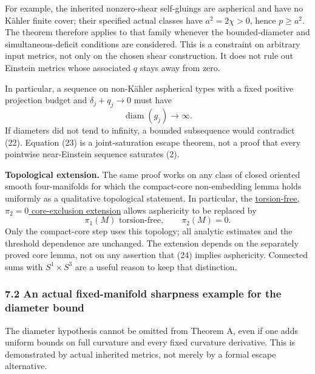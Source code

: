 \documentclass[
  11pt,
]{article}
\begin{document}
For example, the inherited nonzero-shear self-gluings are aspherical and
have no Kähler finite cover; their specified actual classes have
\(a^2=2\chi>0\), hence \(p\ge a^2\). The theorem therefore applies to
that family whenever the bounded-diameter and simultaneous-deficit
conditions are considered. This is a constraint on arbitrary input
metrics, not only on the chosen shear construction. It does not rule out
Einstein metrics whose associated \(q\) stays away from zero.

In particular, a sequence on non-Kähler aspherical types with a fixed
positive projection budget and \(\delta_j+q_j\to0\) must have \[
                           \operatorname{diam}(g_j)\to\infty.
 \tag{23}
\] If diameters did not tend to infinity, a bounded subsequence would
contradict (22). Equation (23) is a joint-saturation escape theorem, not
a proof that every pointwise near-Einstein sequence saturates (2).

\textbf{Topological extension.} The same proof works on any class of
closed oriented smooth four-manifolds for which the compact-core
non-embedding lemma holds uniformly as a qualitative topological
statement. In particular, the
\href{20260923_topological_core_scope.md}{torsion-free, \(\pi_2=0\)
core-exclusion extension} allows asphericity to be replaced by \[
                      \pi_1(M)\text{ torsion-free},
                            \qquad \pi_2(M)=0.
 \tag{24}
\] Only the compact-core step uses this topology; all analytic estimates
and the threshold dependence are unchanged. The extension depends on the
separately proved core lemma, not on any assertion that (24) implies
asphericity. Connected sums with \(S^1\times S^3\) are a useful reason
to keep that distinction.

\hypertarget{an-actual-fixed-manifold-sharpness-example-for-the-diameter-bound}{%
\subsubsection{7.2 An actual fixed-manifold sharpness example for the
diameter
bound}\label{an-actual-fixed-manifold-sharpness-example-for-the-diameter-bound}}

The diameter hypothesis cannot be omitted from Theorem A, even if one
adds uniform bounds on full curvature and every fixed curvature
derivative. This is demonstrated by actual inherited metrics, not merely
by a formal escape alternative.
\end{document}
